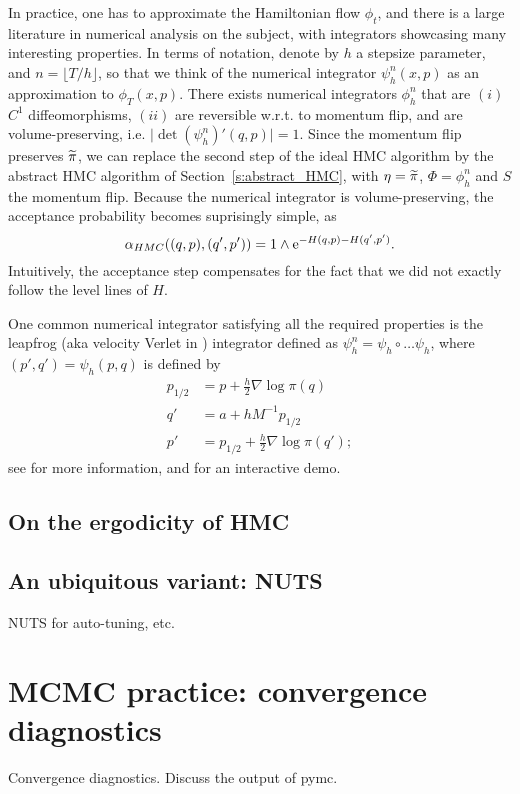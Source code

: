 In practice, one has to approximate the Hamiltonian flow $\phi_t$, and there is a large literature in numerical analysis on the subject, with integrators showcasing many interesting properties.
In terms of notation, denote by $h$ a stepsize parameter, and $n=\lfloor T/h\rfloor$, so that we think of the numerical integrator $\psi_h^n(x,p)$ as an approximation to $\phi_T(x,p)$.
There exists numerical integrators $\phi_h^n$ that are $(i)$ $C^1$ diffeomorphisms, $(ii)$ are reversible w.r.t. to momentum flip, and are volume-preserving, i.e. $\vert \det (\psi_h^n)'(q,p)\vert = 1$.
Since the momentum flip preserves $\widetilde{\pi}$, we can replace the second step of the ideal HMC algorithm by the abstract HMC algorithm of Section~\ref{s:abstract_HMC}, with $\eta=\widetilde{\pi}$, $\Phi=\phi_h^n$ and $S$ the momentum flip. 
Because the numerical integrator is volume-preserving, the acceptance probability becomes suprisingly simple, as 
$$ 
\alpha_{HMC}((q,p),(q',p')) = 1\wedge \mathrm{e}^{-H(q,p)-H(q',p')}.
$$
Intuitively, the acceptance step compensates for the fact that we did not exactly follow the level lines of $H$. 

One common numerical integrator satisfying all the required properties is the leapfrog (aka velocity Verlet in \citep{BoSa18}) integrator defined as $\psi_h^n = \psi_h \circ \dots \psi_h$, where $(p',q') = \psi_h(p,q)$ is defined by
\begin{align*}
    p_{1/2} &= p + \frac{h}{2}\nabla \log \pi(q)\\
    q' &= a+hM^{-1}p_{1/2}\\
    p' &= p_{1/2} + \frac{h}{2} \nabla \log\pi (q');
\end{align*}
see \citep[Section 3]{BoSa18} for more information, and \cfdemo for an interactive demo.

\subsection{On the ergodicity of HMC}

\subsection{An ubiquitous variant: NUTS}
NUTS for auto-tuning, etc.

\section{MCMC practice: convergence diagnostics}
Convergence diagnostics. Discuss the output of pymc.

